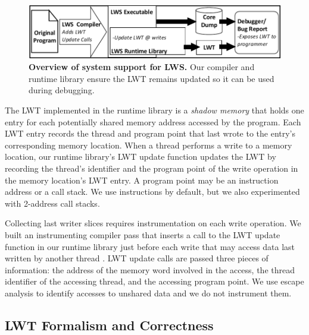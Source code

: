 \documentclass[10pt,nocopyrightspace]{sigplanconf}
\newcommand{\lws}{LWS\xspace}
\newcommand{\lwt}{LWT\xspace}
\newcommand{\Caption}[1]{\begin{minipage}{.95\columnwidth} \caption{#1} \end{minipage} \vspace{-1.2ex}}
\begin{document}
\begin{figure}[h]
\centering
\includegraphics[width=.9\columnwidth]{figs/LWS_Overview.pdf}
\Caption{\label{fig:lwsoverview}{\bf Overview of system support for \lws.} Our compiler and runtime library ensure the \lwt remains updated so it can be used during debugging.}
\end{figure}

The \lwt implemented in the runtime library is a {\em shadow memory} that holds
one entry for each potentially shared memory address accessed by the program.
Each \lwt entry records the thread and program point that last wrote to the
entry's corresponding memory location.  When a thread performs a write to a
memory location, our runtime library's \lwt update function updates the \lwt by
recording the thread's identifier and the program point of the write operation
in the memory location's \lwt entry.  A program point may be an instruction
address or a call stack.  We use instructions by default, but we also experimented
with 2-address call stacks.   

Collecting last writer slices requires instrumentation on each write operation.
We built an instrumenting compiler pass that inserts a call to the \lwt update
function in our runtime library just before each write that may access data
last written by another thread .  \lwt update calls are passed three pieces of
information: the address of the memory word involved in the access, the thread
identifier of the accessing thread, and the accessing program point.   We use
escape analysis to identify accesses to unshared data and we do not instrument
them.  



\subsection{\lwt Formalism and Correctness}
\label{sec:lwssoundness}
\end{document}
